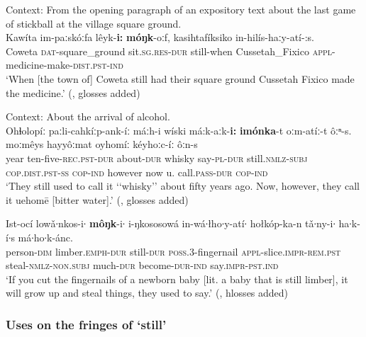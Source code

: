 \begin{exe}
	\ex\label{exAppendixCreek1}
	Context: From the opening paragraph of an expository text about the last game of stickball at the village square ground.\\
	\gll Kawíta im-paːskóːfa lêyk-\textbf{i:} \textbf{móŋk}-oːf, kasihtafíksiko in-hilís-haːy-atí-:s.\\
	Coweta \textsc{dat}-square\_ground sit.\textsc{sg.res}-\textsc{dur} still-when Cussetah\_Fixico \textsc{appl}-medicine-make-\textsc{dist.pst}-\textsc{ind}\\
	\glt \lq When [the town of] Coweta still had their square ground Cussetah Fixico made the medicine.' (\cite[671]{HaasHill2014}, glosses added)
	
	\pagebreak
	\ex\label{exAppendixCreek2}
	Context: About the arrival of alcohol.\\
	\gll Ohɬolopíː paːli-cahkíːp-ank-íː máːh-i wíski má:k-aːk-\textbf{i:} \textbf{imónka}-t oːm-atíː-t ôːⁿ-s. moːmêys hayyôːmat oyhomíː kéyhoːc-íː ôːn-s\\
	year ten-five-\textsc{rec.pst}-\textsc{dur} about-\textsc{dur} whisky say-\textsc{pl}-\textsc{dur} still.\textsc{nmlz}-\textsc{subj} \textsc{cop}.\textsc{dist.pst}-\textsc{ss} \textsc{cop}-\textsc{ind} however now u. call.\textsc{pass}-\textsc{dur} \textsc{cop}-\textsc{ind}\\
	\glt \lq They still used to call it \lq\lq{}whisky\rq\rq{ }about fifty years ago. Now, however, they call it uehomē [bitter water].\rq{ }(\cite[36]{HaasHill2014}, glosses added)
	
	\ex\label{exAppendixCreek3}
	\gll Ist-ocí lowǎ∙nkos-i∙ \textbf{môŋk}-i∙ i-ŋkososowá in-wá∙łho∙y-atí∙ hołkóp-ka-n tǎ∙ny-i∙ ha∙k-í∙s má∙ho∙k-ánc.\\
person-\textsc{dim} limber.\textsc{emph}-\textsc{dur} still-\textsc{dur} \textsc{poss}.3-fingernail \textsc{appl}-slice.\textsc{impr}-\textsc{rem}.\textsc{pst} steal-\textsc{nmlz}-\textsc{non}.\textsc{subj} much-\textsc{dur} become-\textsc{dur}-\textsc{ind} say.\textsc{impr}-\textsc{pst}.\textsc{ind}\\
\glt \lq If you cut the fingernails of a newborn baby [lit. a baby that is still limber], it will grow up and steal things, they used to say.\rq{ }(\cite[297]{HaasHill2014}, hlosses added)
\end{exe}

\subsubsection{Uses on the fringes of \lq{}still\rq{}}
